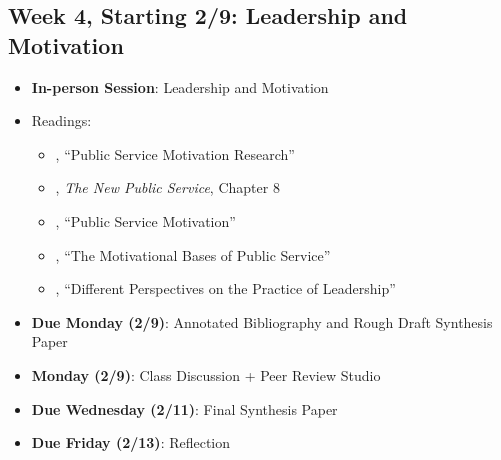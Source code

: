 \documentclass[11pt]{article}     %
\begin{document}
\subsection*{Week 4, Starting 2/9: Leadership and Motivation}
\begin{itemize}
    \item \textbf{In-person Session}: Leadership and Motivation
    \item Readings:
        \begin{itemize}
            \item \citet{Christensen2017}, ``Public Service Motivation Research''
            \item \citet{Denhardt2015}, \emph{The New Public Service}, Chapter 8
            \item \citet{Lachance2017}, ``Public Service Motivation''
            \item \citet{PerryWise1990}, ``The Motivational Bases of Public Service''
            \item \citet{Fairholm2004}, ``Different Perspectives on the Practice of Leadership''
        \end{itemize}
    \item \textbf{Due Monday (2/9)}: Annotated Bibliography and Rough Draft Synthesis Paper
    \item \textbf{Monday (2/9)}: Class Discussion + Peer Review Studio
    \item \textbf{Due Wednesday (2/11)}: Final Synthesis Paper
    \item \textbf{Due Friday (2/13)}: Reflection
\end{itemize}
\end{document}
